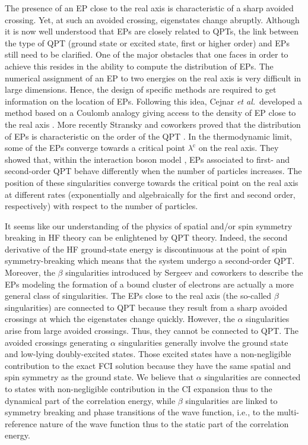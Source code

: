 \documentclass[11pt,a4paper]{article}
\begin{document}
The presence of an EP close to the real axis is characteristic of a sharp avoided crossing. Yet, at such an avoided crossing, eigenstates change abruptly. Although it is now well understood that EPs are closely related to QPTs, the link between the type of QPT (ground state or excited state, first or higher order) and EPs still need to be clarified. One of the major obstacles that one faces in order to achieve this resides in the ability to compute the distribution of EPs. The numerical assignment of an EP to two energies on the real axis is very difficult in large dimensions. Hence, the design of specific methods are required to get information on the location of EPs. Following this idea, Cejnar \textit{et al.}~developed a method based on a Coulomb analogy giving access to the density of EP close to the real axis \cite{Cejnar_2005, Cejnar_2007}. More recently Stransky and coworkers proved that the distribution of EPs is characteristic on the order of the QPT \cite{Stransky_2018}. In the thermodynamic limit, some of the EPs converge towards a critical point $\lambda^\text{c}$ on the real axis. They showed that, within the interaction boson model \cite{Lipkin_1965}, EPs associated to first- and second-order QPT behave differently when the number of particles increases. The position of these singularities converge towards the critical point on the real axis at different rates (exponentially and algebraically for the first and second order, respectively) with respect to the number of particles.

It seems like our understanding of the physics of spatial and/or spin symmetry breaking in HF theory can be enlightened by QPT theory. Indeed, the second derivative of the HF ground-state energy is discontinuous at the point of spin symmetry-breaking which means that the system undergo a second-order QPT. Moreover, the $\beta$ singularities introduced by Sergeev and coworkers to describe the EPs modeling the formation of a bound cluster of electrons are actually a more general class of singularities. The EPs close to the real axis (the so-called $\beta$ singularities) are connected to QPT because they result from a sharp avoided crossings at which the eigenstates change quickly. However, the $\alpha$ singularities arise from large avoided crossings. Thus, they cannot be connected to QPT. The avoided crossings generating $\alpha$ singularities generally involve the ground state and low-lying doubly-excited states. Those excited states have a non-negligible contribution to the exact FCI solution because they have the same spatial and spin symmetry as the ground state. We believe that $\alpha$ singularities are connected to states with non-negligible contribution in the CI expansion thus to the dynamical part of the correlation energy, while $\beta$ singularities are linked to symmetry breaking and phase transitions of the wave function, i.e., to the multi-reference nature of the wave function thus to the static part of the correlation energy.
\end{document}
